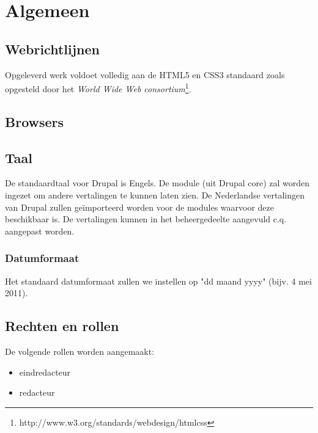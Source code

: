 \section{Algemeen}\label{algemeen}

\subsection{Webrichtlijnen}

Opgeleverd werk voldoet volledig aan de HTML5 en CSS3 standaard zoals opgesteld door het \emph{World Wide Web consortium}\footnote{http://www.w3.org/standards/webdesign/htmlcss}.

\subsection{Browsers}


\subsection{Taal}\label{taal}
De standaardtaal voor Drupal is Engels. De  module (uit Drupal core) zal worden ingezet om andere vertalingen te kunnen laten zien. De Nederlandse vertalingen van Drupal zullen ge\"{i}mporteerd worden voor de modules waarvoor deze beschikbaar is. De vertalingen kunnen in het beheergedeelte aangevuld c.q. aangepast worden.

\subsubsection{Datumformaat}
Het standaard datumformaat zullen we instellen op "dd maand yyyy" (bijv. 4 mei 2011).

\subsection{Rechten en rollen}\label{rollen}

De volgende rollen worden aangemaakt:
\begin{itemize}
\item eindredacteur
\item redacteur
\end{itemize}


